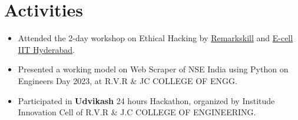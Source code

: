\documentclass[]{roshan-resume}
\begin{document}
\begin{minipage}[t]{0.66\textwidth}
		

		\section{Activities}
		\begin{itemize}
			\item Attended the 2-day workshop on Ethical Hacking by \href{https://www.linkedin.com/company/remarkskill-education/about/}{Remarkskill} and \href{https://www.linkedin.com/company/ecell-iith/}{E-cell IIT Hyderabad}.
			\item Presented a working model on Web Scraper of NSE India using Python on Engineers Day 2023, at R.V.R \& JC COLLEGE OF ENGG. 
			\item Participated in \textbf{Udvikash} 24 hours Hackathon, organized by Institude Innovation Cell of R.V.R \& J.C COLLEGE OF ENGINEERING.
		\end{itemize}
		
	\end{minipage} 
\end{document}
